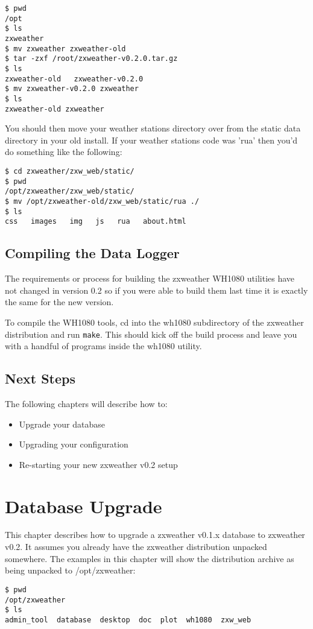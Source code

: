 \documentclass[a4paper,10pt,draft]{book}
\begin{document}
\begin{verbatim}
$ pwd
/opt
$ ls
zxweather
$ mv zxweather zxweather-old
$ tar -zxf /root/zxweather-v0.2.0.tar.gz
$ ls
zxweather-old   zxweather-v0.2.0
$ mv zxweather-v0.2.0 zxweather
$ ls
zxweather-old zxweather
\end{verbatim}

You should then move your weather stations directory over from the static data directory in your old install. If your weather stations code was 'rua' then you'd do something like the following:
\begin{verbatim}
$ cd zxweather/zxw_web/static/
$ pwd
/opt/zxweather/zxw_web/static/
$ mv /opt/zxweather-old/zxw_web/static/rua ./
$ ls
css   images   img   js   rua   about.html
\end{verbatim}

\section{Compiling the Data Logger}
The requirements or process for building the zxweather WH1080 utilities have not changed in version 0.2 so if you were able to build them last time it is exactly the same for the new version.

To compile the WH1080 tools, cd into the wh1080 subdirectory of the zxweather distribution and run \verb|make|. This should kick off the build process and leave you with a handful of programs inside the wh1080 utility.

\section{Next Steps}
The following chapters will describe how to:
\begin{itemize}
\item Upgrade your database
\item Upgrading your configuration
\item Re-starting your new zxweather v0.2 setup
\end{itemize}

\chapter{Database Upgrade}
\label{cha_database}
This chapter describes how to upgrade a zxweather v0.1.x database to zxweather v0.2. It assumes you already have the zxweather distribution unpacked somewhere. The examples in this chapter will show the distribution archive as being unpacked to /opt/zxweather:
\begin{verbatim}
$ pwd
/opt/zxweather
$ ls
admin_tool  database  desktop  doc  plot  wh1080  zxw_web
\end{verbatim}
\end{document}
